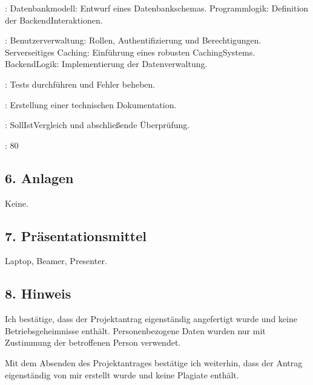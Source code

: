 \documentclass[a4paper,12pt,ngerman]{sphinxmanual}
\begin{document}
\sphinxAtStartPar
{}:
\sphinxhyphen{} Datenbankmodell: Entwurf eines Datenbankschemas.
\sphinxhyphen{} Programmlogik: Definition der Backend\sphinxhyphen{}Interaktionen.

\sphinxAtStartPar
{}:
\sphinxhyphen{} Benutzerverwaltung: Rollen, Authentifizierung und Berechtigungen.
\sphinxhyphen{} Serverseitiges Caching: Einführung eines robusten Caching\sphinxhyphen{}Systems.
\sphinxhyphen{} Backend\sphinxhyphen{}Logik: Implementierung der Datenverwaltung.

\sphinxAtStartPar
{}:
\sphinxhyphen{} Tests durchführen und Fehler beheben.

\sphinxAtStartPar
{}:
\sphinxhyphen{} Erstellung einer technischen Dokumentation.

\sphinxAtStartPar
{}:
\sphinxhyphen{} Soll\sphinxhyphen{}Ist\sphinxhyphen{}Vergleich und abschließende Überprüfung.

\sphinxAtStartPar
{}: 80


\subsection{6. Anlagen}
\label{\detokenize{sections/antrag:anlagen}}
\sphinxAtStartPar
Keine.


\subsection{7. Präsentationsmittel}
\label{\detokenize{sections/antrag:prasentationsmittel}}
\sphinxAtStartPar
Laptop, Beamer, Presenter.


\subsection{8. Hinweis}
\label{\detokenize{sections/antrag:hinweis}}
\sphinxAtStartPar
Ich bestätige, dass der Projektantrag eigenständig angefertigt wurde und keine Betriebsgeheimnisse enthält. Personenbezogene Daten wurden nur mit Zustimmung der betroffenen Person verwendet.

\sphinxAtStartPar
Mit dem Absenden des Projektantrages bestätige ich weiterhin, dass der Antrag eigenständig von mir erstellt wurde und keine Plagiate enthält.
\end{document}
